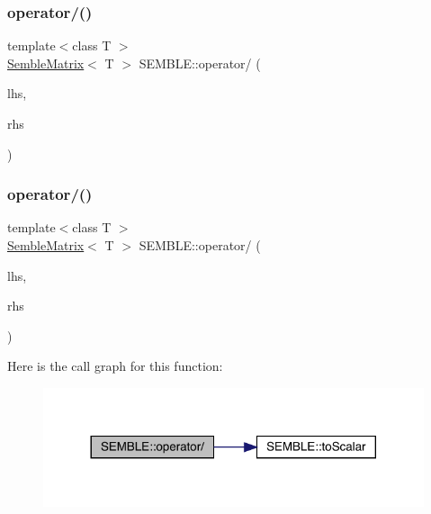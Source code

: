 \subsubsection{\texorpdfstring{operator/()}{operator/()}\hspace{0.1cm}{\footnotesize\ttfamily [4/6]}}
{\footnotesize\ttfamily template$<$class T $>$ \\
\mbox{\hyperlink{structSEMBLE_1_1SembleMatrix}{Semble\+Matrix}}$<$ T $>$ S\+E\+M\+B\+L\+E\+::operator/ (\begin{DoxyParamCaption}\item[{const \mbox{\hyperlink{structSEMBLE_1_1SembleMatrix}{Semble\+Matrix}}$<$ T $>$ \&}]{lhs,  }\item[{const T \&}]{rhs }\end{DoxyParamCaption})}

\mbox{\label{namespaceSEMBLE_a7ee0f7fb882f9f2b52e66fdd2043b659}} 
\subsubsection{\texorpdfstring{operator/()}{operator/()}\hspace{0.1cm}{\footnotesize\ttfamily [5/6]}}
{\footnotesize\ttfamily template$<$class T $>$ \\
\mbox{\hyperlink{structSEMBLE_1_1SembleMatrix}{Semble\+Matrix}}$<$ T $>$ S\+E\+M\+B\+L\+E\+::operator/ (\begin{DoxyParamCaption}\item[{const \mbox{\hyperlink{structSEMBLE_1_1SembleMatrix}{Semble\+Matrix}}$<$ T $>$ \&}]{lhs,  }\item[{const typename \mbox{\hyperlink{structSEMBLE_1_1PromoteScalar}{Promote\+Scalar}}$<$ T $>$\+::Type \&}]{rhs }\end{DoxyParamCaption})}

Here is the call graph for this function\+:
\nopagebreak
\begin{figure}[H]
\begin{center}
\leavevmode
\includegraphics[width=317pt]{d7/dfd/namespaceSEMBLE_a7ee0f7fb882f9f2b52e66fdd2043b659_cgraph}
\end{center}
\end{figure}
\mbox{\label{namespaceSEMBLE_ac83596afe76161af0e77ecee21d378dd}} 
